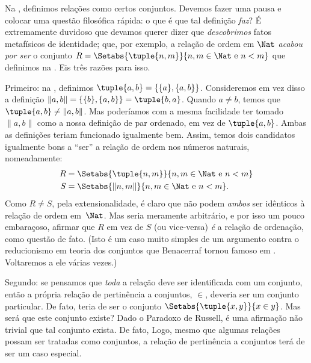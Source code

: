 \documentclass[../../../include/open-logic-section]{subfiles}
\begin{document}

Na , definimos relações como certos conjuntos. Devemos
fazer uma pausa e colocar uma questão filosófica rápida: o que é que tal
definição \emph{faz}? É extremamente duvidoso que devamos querer
dizer que \emph{descobrimos} fatos metafísicos de identidade; que, por
exemplo, a relação de ordem em $\Nat$ \emph{acabou por ser} o conjunto
$R=  \Setabs{\tuple{n,m}}{n, m \in \Nat\text{ e }
n < m}$ que definimos na . Eis três
razões para isso. 

Primeiro: na , definimos $\tuple{a, b} =
\{\{a\}, \{a, b\}\}$. Consideremos em vez disso a definição $\lVert a,
b\rVert = \{\{b\}, \{a, b\}\} = \tuple{b,a}$. Quando $a \neq b$, temos
que $\tuple{a, b} \neq \lVert a,b\rVert$. Mas poderíamos com a mesma
facilidade ter tomado $\lVert a,b\rVert$ como a nossa definição de par ordenado,
em vez de $\tuple{a,b}$. Ambas as definições teriam funcionado igualmente
bem. Assim, temos dois candidatos igualmente bons a ``ser'' a relação de
ordem nos números naturais, nomeadamente:
\begin{align*}
		R &= \Setabs{\tuple{n,m}}{n, m \in \Nat \text{ e }n < m}\\
		S &= \Setabs{\lVert n,m\rVert}{n, m \in \Nat \text{ e }n < m}.
\end{align*}
Como $R \neq S$, pela extensionalidade, é claro que não podem
\emph{ambos} ser idênticos à relação de ordem em~$\Nat$. Mas seria
meramente arbitrário, e por isso um pouco embaraçoso, afirmar que $R$
em vez de $S$ (ou vice-versa) \emph{é} a relação de ordenação, como
questão de fato. (Isto é um caso muito simples de um argumento contra o
reducionismo em teoria dos conjuntos que Benacerraf tornou famoso em
\citeyear{Benacerraf1965}. Voltaremos a ele várias vezes.)

Segundo: se pensamos que \emph{toda} a relação deve ser identificada
com um conjunto, então a própria relação de pertinência a conjuntos, $\in$, deveria
ser um conjunto particular. De fato, teria de ser o conjunto
$\Setabs{\tuple{x,y}}{x \in y}$. Mas será que este conjunto existe? Dado
o Paradoxo de Russell, é uma afirmação não trivial que tal conjunto exista.
De fato, 
Logo, mesmo que algumas relações possam ser tratadas como conjuntos, a relação de
pertinência a conjuntos terá de ser um caso especial.
\end{document}

